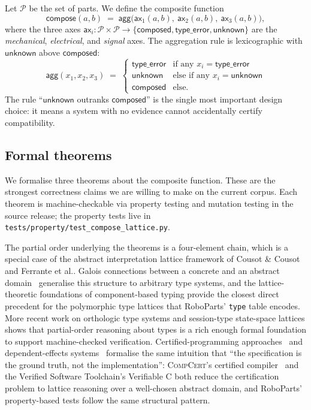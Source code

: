 \documentclass[11pt,twocolumn]{article}
\begin{document}
Let $\mathcal{P}$ be the set of parts. We define the composite
function
\begin{equation}
  \mathsf{compose}(a, b) \;=\;
    \mathsf{agg}\!\bigl(\mathsf{ax}_1(a,b),\
    \mathsf{ax}_2(a,b),\ \mathsf{ax}_3(a,b)\bigr),
  \label{eq:compose}
\end{equation}
where the three axes $\mathsf{ax}_i : \mathcal{P}\times\mathcal{P}
\to \{\mathsf{composed}, \mathsf{type\_error}, \mathsf{unknown}\}$
are the \emph{mechanical}, \emph{electrical}, and \emph{signal}
axes. The aggregation rule is lexicographic with $\mathsf{unknown}$
above $\mathsf{composed}$:
\begin{equation}
  \mathsf{agg}(x_1, x_2, x_3) \;=\;
  \begin{cases}
    \mathsf{type\_error} & \text{if any } x_i = \mathsf{type\_error}\\
    \mathsf{unknown}     & \text{else if any } x_i = \mathsf{unknown}\\
    \mathsf{composed}    & \text{else.}
  \end{cases}
  \label{eq:agg}
\end{equation}
The rule ``$\mathsf{unknown}$ outranks $\mathsf{composed}$'' is the
single most important design choice: it means a system with no
evidence cannot accidentally certify compatibility.

\subsection{Formal theorems}
\label{sec:theorems}

We formalise three theorems about the composite function. These
are the strongest correctness claims we are willing to make on
the current corpus. Each theorem is machine-checkable via property
testing and mutation testing in the source release; the property
tests live in \texttt{tests/property/test\_compose\_lattice.py}.

The partial order underlying the theorems is a
four-element chain, which is a special case of the abstract
interpretation lattice framework of Cousot & Cousot~\cite{Cousot2004}
and Ferrante et al.\cite{Ferrante1979}. Galois connections between
a concrete and an abstract domain~\cite{GaloiConnection2006}
generalise this structure to arbitrary type systems, and the
lattice-theoretic foundations of component-based typing
\cite{LatticeTypes2001} provide the closest direct precedent for
the polymorphic type lattices that RoboParts' \texttt{type} table
encodes. More recent work on orthologic type systems
\cite{Orthologic2025} and session-type state-space lattices
\cite{SessionLattice2024} shows that partial-order reasoning about
types is a rich enough formal foundation to support
machine-checked verification. Certified-programming
approaches~\cite{CoqArt2004,CoqRef2020} and dependent-effects
systems~\cite{FStar2016} formalise the same intuition that
``the specification is the ground truth, not the implementation'':
\textsc{CompCert}'s certified compiler~\cite{CompCert2007} and the
Verified Software Toolchain's Verifiable C
\cite{VST2014} both reduce the certification problem to lattice
reasoning over a well-chosen abstract domain, and RoboParts'
property-based tests follow the same structural pattern.
\end{document}
